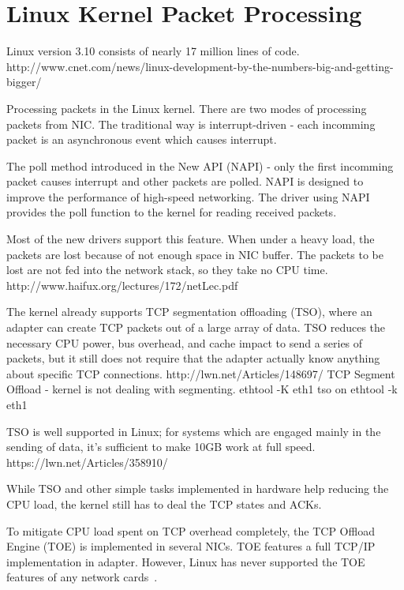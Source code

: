 
\chapter{Linux Kernel Packet Processing}

Linux version 3.10 consists of nearly 17 million lines of code.
http://www.cnet.com/news/linux-development-by-the-numbers-big-and-getting-bigger/

Processing packets in the Linux kernel.
There are two modes of processing packets from NIC.
The traditional way is interrupt-driven - each incomming packet is an
asynchronous event which causes interrupt.

The poll method introduced in the New API (NAPI) - only the first incomming packet causes interrupt
and other packets are polled.
NAPI is designed to improve the performance of high-speed networking.
The driver using NAPI provides the poll function to the kernel for reading received packets.

Most of the new drivers support this feature.
When under a heavy load, the packets are lost because of not enough space in NIC buffer.
The packets to be lost are not fed into the network stack, so they take no CPU time.
http://www.haifux.org/lectures/172/netLec.pdf


The kernel already supports TCP segmentation offloading (TSO), where an adapter can create TCP packets out of a large array of data.
TSO reduces the necessary CPU power, bus overhead, and cache impact to send a series of packets,
but it still does not require that the adapter actually know anything about specific TCP connections.
http://lwn.net/Articles/148697/
TCP Segment Offload - kernel is not dealing with segmenting.
ethtool -K eth1 tso on
ethtool -k eth1

TSO is well supported in Linux; for systems which are engaged mainly in the sending of data, it's sufficient to make 10GB work at full speed.
https://lwn.net/Articles/358910/


While TSO and other simple tasks implemented in hardware help reducing the CPU load,
the kernel still has to deal the TCP states and ACKs.

To mitigate CPU load spent on TCP overhead completely, the TCP Offload Engine (TOE) is implemented in several NICs.
TOE features a full TCP/IP implementation in adapter.
However, Linux has never supported the TOE features of any network cards~\cite{http://lwn.net/Articles/148697/}.

